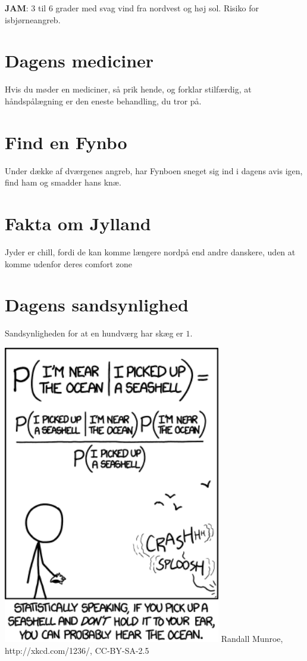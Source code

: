 \begin{minipage}[b]{0.95\linewidth}
\begin{minipage}[t]{0.47\textwidth}
\textbf{JAM}: 3 til 6 grader med svag vind fra nordvest og høj sol. Risiko for isbjørneangreb.

\vspace{-2mm}
\section*{Dagens mediciner}
Hvis du møder en mediciner, så prik hende, og forklar stilfærdig, at håndspålægning er den eneste behandling, du tror på.

\vspace{-2mm}
\section*{Find en Fynbo}
Under dække af dværgenes angreb, har Fynboen sneget sig ind i dagens avis igen, find ham og smadder hans knæ.

\vspace{-2mm}
\section*{Fakta om Jylland}
Jyder er chill, fordi de kan komme længere nordpå end andre danskere, uden at komme udenfor deres comfort zone

\vspace{-2mm}
\section*{Dagens sandsynlighed}
Sandsynligheden for at en hundværg har skæg er $1$.

\vspace{1mm}
\includegraphics[width=95mm]{seashell.png}
\tiny Randall Munroe, http://xkcd.com/1236/, CC-BY-SA-2.5
\end{minipage}


\end{minipage}
